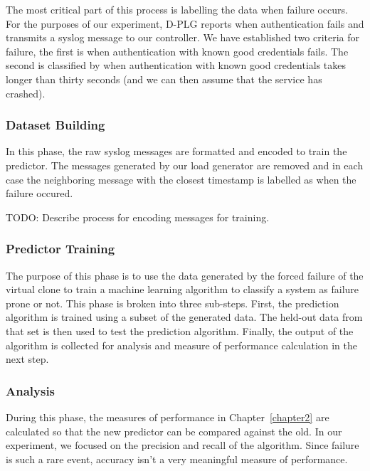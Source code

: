 The most critical part of this process is labelling the data when failure
occurs.  For the purposes of our experiment, D-PLG reports when authentication
fails and transmits a syslog message to our controller.  We have established
two criteria for failure, the first is when authentication with known good
credentials fails.  The second is classified by when authentication with known
good credentials takes longer than thirty seconds (and we can then assume that
the service has crashed).

\subsubsection{Dataset Building}
In this phase, the raw syslog messages are formatted and encoded to train the
predictor.  The messages generated by our load generator are removed and in
each case the neighboring message with the closest timestamp is labelled as
when the failure occured.

TODO:  Describe process for encoding messages for training.

\subsubsection{Predictor Training}
The purpose of this phase is to use the data generated by the forced failure of
the virtual clone to train a machine learning algorithm to classify a system as
failure prone or not.  This phase is broken into three sub-steps.  First, the
prediction algorithm is trained using a subset of the generated data.  The
held-out data from that set is then used to test the prediction algorithm.
Finally, the output of the algorithm is collected for analysis and measure of
performance calculation in the next step.

\subsubsection{Analysis}
During this phase, the measures of performance in Chapter~\ref{chapter2} are
calculated so that the new predictor can be compared against the old.  In our
experiment, we focused on the precision and recall of the algorithm.  Since
failure is such a rare event, accuracy isn't a very meaningful measure of
performance.

